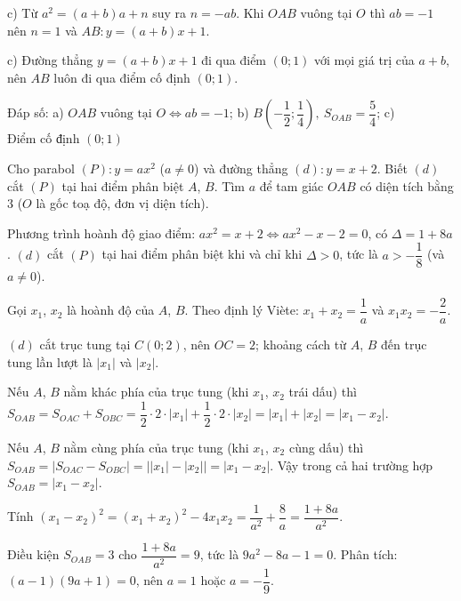 \begin{problem}[9DS-HSB2-050]
\begin{solution}
c) Từ $a^2 = (a + b)a + n$ suy ra $n = -ab$. Khi $OAB$ vuông tại $O$ thì $ab = -1$ nên $n = 1$ và $AB\colon y = (a + b)x + 1$.

c) Đường thẳng $y = (a + b)x + 1$ đi qua điểm $(0; 1)$ với mọi giá trị của $a + b$, nên $AB$ luôn đi qua điểm cố định $(0; 1)$.

Đáp số: a) $\boxed{OAB \text{ vuông tại } O \Leftrightarrow ab = -1}$; b) $\boxed{B\left(-\dfrac{1}{2}; \dfrac{1}{4}\right),\ S_{OAB} = \dfrac{5}{4}}$; c) $\boxed{\text{Điểm cố định } (0; 1)}$
\end{solution}
\end{problem}

\begin{problem}[9DS-HSB2-051]
Cho parabol $(P)\colon y = ax^2$ ($a \neq 0$) và đường thẳng $(d)\colon y = x + 2$. Biết $(d)$ cắt $(P)$ tại hai điểm phân biệt $A$, $B$. Tìm $a$ để tam giác $OAB$ có diện tích bằng $3$ ($O$ là gốc toạ độ, đơn vị diện tích).

\begin{solution}
Phương trình hoành độ giao điểm: $ax^2 = x + 2 \Leftrightarrow ax^2 - x - 2 = 0$, có $\Delta = 1 + 8a$. $(d)$ cắt $(P)$ tại hai điểm phân biệt khi và chỉ khi $\Delta > 0$, tức là $a > -\dfrac{1}{8}$ (và $a \neq 0$).

Gọi $x_1$, $x_2$ là hoành độ của $A$, $B$. Theo định lý Viète: $x_1 + x_2 = \dfrac{1}{a}$ và $x_1x_2 = -\dfrac{2}{a}$.

$(d)$ cắt trục tung tại $C(0; 2)$, nên $OC = 2$; khoảng cách từ $A$, $B$ đến trục tung lần lượt là $|x_1|$ và $|x_2|$.

Nếu $A$, $B$ nằm khác phía của trục tung (khi $x_1$, $x_2$ trái dấu) thì $S_{OAB} = S_{OAC} + S_{OBC} = \dfrac{1}{2} \cdot 2 \cdot |x_1| + \dfrac{1}{2} \cdot 2 \cdot |x_2| = |x_1| + |x_2| = |x_1 - x_2|$.

Nếu $A$, $B$ nằm cùng phía của trục tung (khi $x_1$, $x_2$ cùng dấu) thì $S_{OAB} = \left|S_{OAC} - S_{OBC}\right| = \left||x_1| - |x_2|\right| = |x_1 - x_2|$. Vậy trong cả hai trường hợp $S_{OAB} = |x_1 - x_2|$.

Tính $(x_1 - x_2)^2 = (x_1 + x_2)^2 - 4x_1x_2 = \dfrac{1}{a^2} + \dfrac{8}{a} = \dfrac{1 + 8a}{a^2}$.

Điều kiện $S_{OAB} = 3$ cho $\dfrac{1 + 8a}{a^2} = 9$, tức là $9a^2 - 8a - 1 = 0$. Phân tích: $(a - 1)(9a + 1) = 0$, nên $a = 1$ hoặc $a = -\dfrac{1}{9}$.


\end{solution}
\end{problem}
